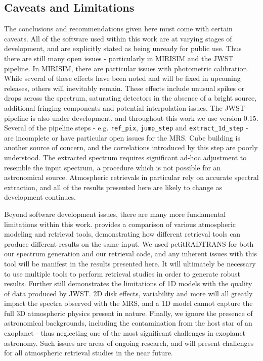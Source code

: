 \subsection{Caveats and Limitations}
The conclusions and recommendations given here must come with certain caveats.
All of the software used within this work are at varying stages of development, and are explicitly stated as being unready for public use.
Thus there are still many open issues - particularly in MIRISIM and the JWST pipeline.
In MIRISIM, there are particular issues with photometric calibration. 
While several of these effects have been noted and will be fixed in upcoming releases, others will inevitably remain.
These effects include unusual spikes or drops across the spectrum, saturating detectors in the absence of a bright source, additional fringing components and potential interpolation issues.
The JWST pipeline is also under development, and throughout this work we use version 0.15.
Several of the pipeline steps - e.g. \verb|ref_pix|, \verb|jump_step| and \verb|extract_1d_step| - are incomplete or have particular open issues for the MRS.
Cube building is another source of concern, and the correlations introduced by this step are poorly understood.
The extracted spectrum requires significant ad-hoc adjustment to resemble the input spectrum, a procedure which is not possible for an astronomical source.
Atmospheric retrievals in particular rely on accurate spectral extraction, and all of the results presented here are likely to change as development continues.

Beyond software development issues, there are many more fundamental limitations within this work.
\parencite{Barstow2020} provides a comparison of various atmospheric modeling and retrieval tools, demonstrating how different retrieval tools can produce different results on the same input.
We used petitRADTRANS for both our spectrum generation and our retrieval code, and any inherent issues with this tool will be manifest in the results presented here.
It will ultimately be necessary to use multiple tools to perform retrieval studies in order to generate robust results.
Further still \parencite{Taylor2020} demonstrates the limitations of 1D models with the quality of data produced by JWST.
2D disk effects, variability and more will all greatly impact the spectra observed with the MRS, and a 1D model cannot capture the full 3D atmospheric physics present in nature.
Finally, we ignore the presence of astronomical backgrounds, including the contamination from the host star of an exoplanet - thus neglecting one of the most significant challenges in exoplanet astronomy.
Such issues are areas of ongoing research, and will present challenges for all atmospheric retrieval studies in the near future.

